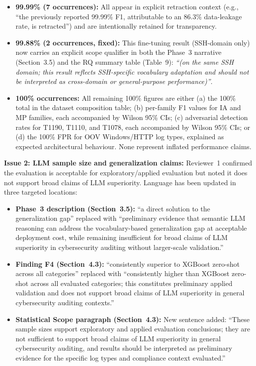 \documentclass[12pt, a4paper]{article}
\begin{document}
\begin{itemize}
  \item \textbf{99.99\% (7 occurrences):} All appear in explicit retraction context
        (e.g., ``the previously reported 99.99\% F1, attributable to an 86.3\% data-leakage
        rate, is retracted'') and are intentionally retained for transparency.

  \item \textbf{99.88\% (2 occurrences, fixed):} This fine-tuning result (SSH-domain
        only) now carries an explicit scope qualifier in both the Phase~3 narrative
        (Section~3.5) and the RQ summary table (Table~9):
        \textit{``(on the same SSH domain; this result reflects SSH-specific vocabulary
        adaptation and should not be interpreted as cross-domain or general-purpose
        performance)''}.

  \item \textbf{100\% occurrences:} All remaining 100\% figures are either (a) the 100\%
        total in the dataset composition table; (b) per-family F1 values for IA and MP
        families, each accompanied by Wilson 95\% CIs; (c) adversarial detection rates for
        T1190, T1110, and T1078, each accompanied by Wilson 95\% CIs; or (d) the 100\% FPR
        for OOV Windows/HTTP log types, explained as expected architectural behaviour.
        None represent inflated performance claims.
\end{itemize}

\noindent\textbf{Issue 2: LLM sample size and generalization claims:}
Reviewer~1 confirmed the evaluation is acceptable for exploratory/applied evaluation but
noted it does not support broad claims of LLM superiority. Language has been updated in
three targeted locations:

\begin{itemize}
  \item \textbf{Phase~3 description (Section~3.5):} ``a direct solution to the
        generalization gap'' replaced with ``preliminary evidence that semantic LLM
        reasoning can address the vocabulary-based generalization gap at acceptable
        deployment cost, while remaining insufficient for broad claims of LLM superiority
        in cybersecurity auditing without larger-scale validation.''

  \item \textbf{Finding F4 (Section~4.3):} ``consistently superior to XGBoost zero-shot
        across all categories'' replaced with ``consistently higher than XGBoost zero-shot
        across all evaluated categories; this constitutes preliminary applied validation
        and does not support broad claims of LLM superiority in general cybersecurity
        auditing contexts.''

  \item \textbf{Statistical Scope paragraph (Section~4.3):} New sentence added:
        ``These sample sizes support exploratory and applied evaluation conclusions; they
        are not sufficient to support broad claims of LLM superiority in general
        cybersecurity auditing, and results should be interpreted as preliminary evidence
        for the specific log types and compliance context evaluated.''
\end{itemize}
\end{document}
